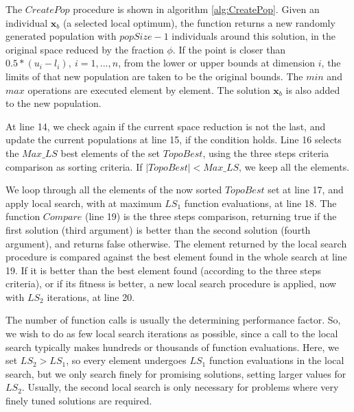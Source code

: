 


The $CreatePop$ procedure is shown in algorithm \ref{alg:CreatePop}. Given an individual $\bm{x}_b$ (a selected local optimum), the function returns a new randomly generated population with $popSize-1$ individuals around this solution, in the original space reduced by the fraction $\phi$. If the point is closer than $0.5 * (u_i - l_i), \ i = 1, ..., n$, from the lower or upper bounds at dimension $i$, the limits of that new population are taken to be the original bounds. The $min$ and $max$ operations are executed element by element. The solution $\bm{x}_b$ is also added to the new population.


At line 14, we check again if the current space reduction is not the last, and update the current populations at line 15, if the condition holds. Line 16 selects the $Max\_LS$ best elements of the set $TopoBest$, using the three steps criteria comparison as sorting criteria. If $|TopoBest| < Max\_LS$, we keep all the elements.

We loop through all the elements of the now sorted $TopoBest$ set at line 17, and apply local search, with at maximum $LS_1$ function evaluations, at line 18. The function $Compare$ (line 19) is the three steps comparison, returning true if the first solution (third argument) is better than the second solution (fourth argument), and returns false otherwise. The element returned by the local search procedure is compared against the best element found in the whole search at line 19. If it is better than the best element found (according to the three steps criteria), or if its fitness is better, a new local search procedure is applied, now with $LS_2$ iterations, at line 20.


The number of function calls is usually the determining performance factor. So, we wish to do as few local search iterations as possible, since a call to the local search typically makes hundreds or thousands of function evaluations. Here, we set $LS_2 > LS_1$, so every element undergoes $LS_1$ function evaluations in the local search, but we only search finely for promising solutions, setting larger values for $LS_2$. Usually, the second local search is only necessary for problems where very finely tuned solutions are required.

